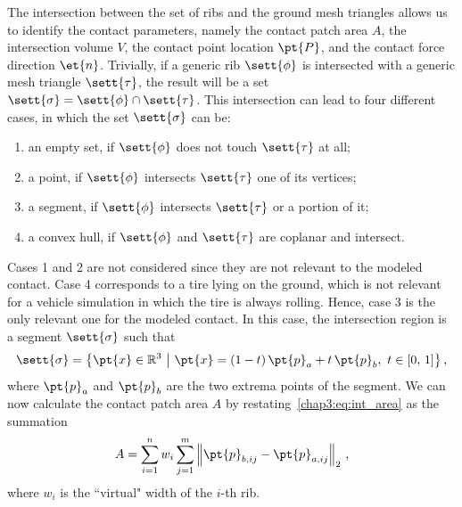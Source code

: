 The intersection between the set of ribs  and the ground mesh triangles  allows us to identify the contact parameters, namely the contact patch area $A$, the intersection volume $V$, the contact point location $\pt{P}$, and the contact force direction $\et{n}$. Trivially, if a generic rib $\sett{\phi}$ is intersected with a generic mesh triangle $\sett{\tau}$, the result will be a set $\sett{\sigma} = \sett{\phi} \cap \sett{\tau}$. This intersection can lead to four different cases, in which the set $\sett{\sigma}$ can be:
%
\begin{enumerate}
  \setlength\itemsep{0pt}
  \item an empty set, if $\sett{\phi}$ does not touch $\sett{\tau}$ at all;
  \item a point, if $\sett{\phi}$ intersects $\sett{\tau}$ one of its vertices;
  \item a segment, if $\sett{\phi}$ intersects $\sett{\tau}$ or a portion of it;
  \item a convex hull, if $\sett{\phi}$ and $\sett{\tau}$ are coplanar and intersect.
\end{enumerate}
%
Cases 1 and 2 are not considered since they are not relevant to the modeled contact. Case 4 corresponds to a tire lying on the ground, which is not relevant for a vehicle simulation in which the tire is always rolling. Hence, case 3 is the only relevant one for the modeled contact. In this case, the intersection region is a segment $\sett{\sigma}$ such that
%
\begin{equation*}
  \sett{\sigma} = \big\{ \pt{x}\in\mathbb{R}^3 ~ \big\lvert ~ \pt{x}=(1-t)\,\pt{p}_a + t\,\pt{p}_b, ~ t \in [0, \, 1] \big\}
  \,\text{,}
\end{equation*}
%
where $\pt{p}_a$ and $\pt{p}_b$ are the two extrema points of the segment. We can now calculate the contact patch area $A$ by restating~\eqref{chap3:eq:int_area} as the summation
%
\begin{equation}
  A = \sum_{i=1}^{n} w_i \sum_{j=1}^{m} \left\|\pt{p}_{b,ij} - \pt{p}_{a,ij}\right\|_{2}
  \,\text{,}
  \label{chap3:eq:int_a_crt}
\end{equation}
%
where $w_i$ is the ``virtual" width of the $i$-th rib.

